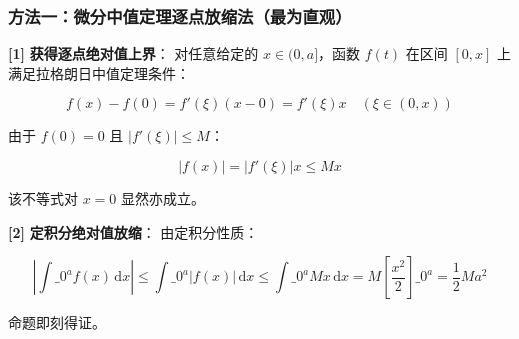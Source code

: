 \documentclass[11pt,a4paper,UTF8]{ctexart}
\begin{document}
\subsubsection{方法一：微分中值定理逐点放缩法（最为直观）}
\begin{solbox}[分步推导与答题规范]
\textbf{[1]}  \textbf{获得逐点绝对值上界}：
对任意给定的 $x \in (0, a]$，函数 $f(t)$ 在区间 $[0, x]$ 上满足拉格朗日中值定理条件：

\begin{equation*}
f(x) - f(0) = f'(\xi) (x - 0) = f'(\xi) x \quad (\xi \in (0, x))
\end{equation*}

由于 $f(0) = 0$ 且 $|f'(\xi)| \le M$：

\begin{equation*}
|f(x)| = |f'(\xi)| x \le M x
\end{equation*}

该不等式对 $x = 0$ 显然亦成立。

\textbf{[2]}  \textbf{定积分绝对值放缩}：
由定积分性质：

\begin{equation*}
\left| \int\_0^a f(x)\,\mathrm{d}x \right| \le \int\_0^a |f(x)|\,\mathrm{d}x \le \int\_0^a M x\,\mathrm{d}x = M \left[ \frac{x^2}{2} \right]\_0^a = \frac{1}{2} M a^2
\end{equation*}

命题即刻得证。
\end{solbox}
\end{document}

